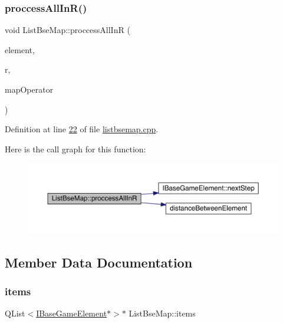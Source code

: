 \mbox{\label{a00169_a634c821cf280b64eb56ceac190635b1a}} 
\subsubsection{\texorpdfstring{proccess\+All\+In\+R()}{proccessAllInR()}\hspace{0.1cm}{\footnotesize\ttfamily [2/2]}}
{\footnotesize\ttfamily void List\+Bse\+Map\+::proccess\+All\+InR (\begin{DoxyParamCaption}\item[{\hyperlink{a00137}{I\+Base\+Game\+Element} $\ast$}]{element,  }\item[{double}]{r,  }\item[{bool(\&)(\hyperlink{a00137}{I\+Base\+Game\+Element} $\ast$)}]{map\+Operator }\end{DoxyParamCaption})}



Definition at line \hyperlink{a00062_source_l00022}{22} of file \hyperlink{a00062_source}{listbsemap.\+cpp}.

Here is the call graph for this function\+:
\nopagebreak
\begin{figure}[H]
\begin{center}
\leavevmode
\includegraphics[width=350pt]{de/d53/a00169_a634c821cf280b64eb56ceac190635b1a_cgraph}
\end{center}
\end{figure}


\subsection{Member Data Documentation}
\mbox{\label{a00169_a72a6386e492d05685e86f7fb858e3b32}} 
\subsubsection{\texorpdfstring{items}{items}}
{\footnotesize\ttfamily Q\+List$<$\hyperlink{a00137}{I\+Base\+Game\+Element}$\ast$$>$$\ast$ List\+Bse\+Map\+::items\hspace{0.3cm}{\ttfamily [protected]}}



